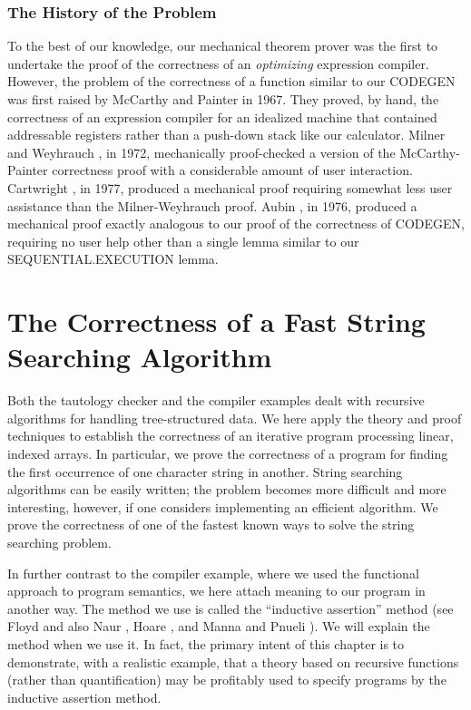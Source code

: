 \documentclass[10pt]{book}
\begin{document}
\subsection{The History of the Problem}
To the best of our knowledge, our mechanical theorem prover
was the first to undertake the proof of the correctness of an \emph{optimizing} expression compiler.
However, the problem of the correctness of a function similar to our
CODEGEN was first raised by McCarthy and Painter \cite{MCCPAINTER}
in 1967.  They proved, by hand, the correctness of an
expression compiler for an idealized
machine that contained addressable registers
rather than a push-down stack like our calculator.
Milner and Weyhrauch \cite{MILNER}, in 1972, mechanically  proof-checked
a version of
the
McCarthy-Painter correctness proof with a considerable amount of user
interaction.  Cartwright \cite{CARTWRIGHT}, in 1977, produced a mechanical
proof requiring somewhat less user assistance
than the Milner-Weyhrauch proof.
Aubin \cite{AUBIN}, in 1976, produced a mechanical proof exactly
analogous to our proof of the correctness of CODEGEN, requiring
no user help other than
a
single lemma similar to our SEQUENTIAL.EXECUTION lemma.

\chapter{The Correctness of a Fast String Searching Algorithm}
\pagestyle{headings}
\label{SECFSTRPOS}
Both the tautology checker and the compiler examples dealt with
recursive algorithms for handling tree-structured data.  We  here
apply the theory and proof techniques to establish the correctness of an
iterative program processing linear, indexed arrays.  In particular,
we  prove the correctness of a program for finding the first occurrence
of one character string in another.
String searching algorithms can be easily written;
the problem becomes more difficult and more interesting, however, if one
considers implementing an efficient algorithm.  We  prove the
correctness of one of the fastest known ways to solve the string
searching problem.

In further contrast to the compiler example, where we used the
functional approach to program semantics, we  here attach meaning
to our program in another way.  The method we  use is called
the ``inductive assertion'' method (see Floyd \cite{FLOYD} and
also Naur \cite{NAUR}, Hoare \cite{HOARE}, and Manna and Pnueli \cite{MANNA}).
We will explain the method when we use it.
In fact, the primary intent of this chapter is to demonstrate,
with a realistic example, that a theory based on recursive functions (rather than quantification)
may be profitably used to specify programs by the inductive assertion
method.
\end{document}
